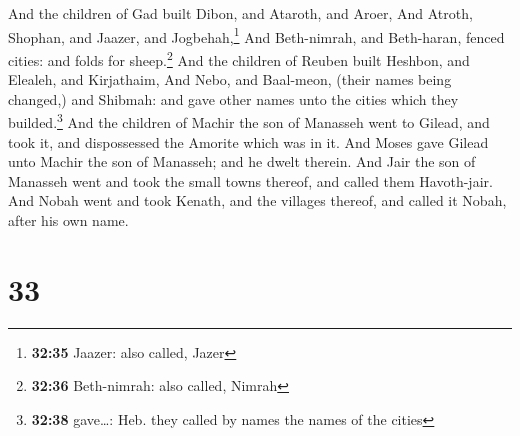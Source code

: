  And the children of Gad built Dibon, and Ataroth, and
Aroer,  And Atroth, Shophan, and Jaazer, and
Jogbehah,\footnote{\textbf{32:35} Jaazer: also called, Jazer}
 And Beth-nimrah, and Beth-haran, fenced cities: and
folds for sheep.\footnote{\textbf{32:36} Beth-nimrah: also called,
  Nimrah}  And the children of Reuben built Heshbon, and
Elealeh, and Kirjathaim,  And Nebo, and Baal-meon, (their
names being changed,) and Shibmah: and gave other names unto the cities
which they builded.\footnote{\textbf{32:38} gave\ldots: Heb. they called
  by names the names of the cities}  And the children of
Machir the son of Manasseh went to Gilead, and took it, and dispossessed
the Amorite which was in it.  And Moses gave Gilead unto
Machir the son of Manasseh; and he dwelt therein.  And
Jair the son of Manasseh went and took the small towns thereof, and
called them Havoth-jair.  And Nobah went and took Kenath,
and the villages thereof, and called it Nobah, after his own name.

\hypertarget{section-32}{%
\section{33}\label{section-32}}

